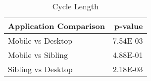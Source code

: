 \begin{table}[ht]
\centering
\caption{Cycle Length} 
\begin{tabular}{lr}
  \hline
Application Comparison & p-value \\ 
  \hline
Mobile vs Desktop & 7.54E-03 \\ 
  Mobile vs Sibling & 4.88E-01 \\ 
  Sibling vs Desktop & 2.18E-03 \\ 
   \hline
\end{tabular}
\label{tab:cycles}
\end{table}
